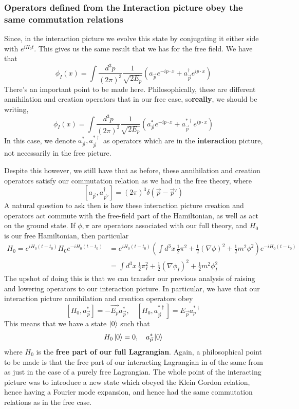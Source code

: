 \documentclass[11pt, oneside]{article}   	%
\theoremstyle{newline}
\theoremstyle{newline}
\theoremstyle{newline}
\theoremstyle{newline}
\theoremstyle{newline}
\begin{document}
\subsubsection{Operators defined from the Interaction picture obey the same commutation relations} 
Since, in the interaction picture we evolve this 
state by conjugating it either side with $ e^{ i  H_0 t }$. 
This gives us the same result that we 
has for the free field. We have that 
\[
\phi_ I ( x) = \int \frac{ d^ 3 p }{ ( 2 \pi ) ^3 } \frac{ 1 }{ \sqrt{ 2 E_p }  } (a_{ \vec{p}}  e^{  - i p \cdot  x } + a_{ \vec{p} }^\dagger e^{ i p \cdot  x } )  
\] There's an important point to be made here. 
Philosophically, these are different annihilation and 
creation operators that in our free case, so\textbf{really}, 
we should be writing, 
\[
\phi_ I ( x) = \int \frac{ d^ 3 p }{ ( 2 \pi ) ^3 } \frac{ 1 }{ \sqrt{ 2 E_p }  } (a_{ \vec{p}}^*  e^{  - i p \cdot  x } + a_{ \vec{p} }^{* \dagger}  e^{ i p \cdot  x } )  
\]
In this case, we denote $ a_{ \vec{p}}^ * , a_{\vec{p}}^ { * \dagger }  $ as 
operators which are in the \textbf{interaction} picture, 
not necessarily in the free picture. 

Despite this however, we still have that 
as before, these annihilation and 
creation operators satisfy our commutation relation as we had in 
the free theory, where 
\[
[ a_{ \vec{p} } , a_{ \vec{p}' } ^ \dagger ] = ( 2 \pi ) ^ 3 \delta ( \vec{p}- \vec{p}' ) 
\] 
A natural question to ask then is how these interaction picture
creation and operators act commute with the free-field part of the Hamiltonian, 
as well as act on the ground state. If $\phi , \pi $ are operators
associated with our full theory, and $ H_0 $ is our free Hamiltonian, 
then particular 
\begin{align*}
H_0 = e^{ i H_0 ( t - t_0) } H_0 e ^{  - iH_0 ( t - t_0) } &=   e^{ i H_0 ( t - t_0) } \left( \int d^ 3 x \, \frac{1}{2} \pi ^ 2 + \frac{1}{2 } ( \nabla  \phi ) ^ 2 + \frac{1}{2 } m ^ 2 \phi ^ 2  \right)   e ^{  - iH_0 ( t - t_0) } \\
				    &=  \int d^ 3 x \,  \frac{1}{2 } \pi_I ^ 2 +  \frac{1}{2 }( \nabla \phi_I ) ^ 2  + \frac{1}{2 } m^ 2 \phi_I ^ 2  
\end{align*}
The upshot of doing this is that we can transfer our previous analysis of raising and
lowering operators to our interaction picture. In particular, 
we have that our interaction picture annihilation and creation operators obey 
\[
[ H_0 , a_{ \vec{p} } ^ * ] = - \vec{E_p} a_{ \vec{p} }^ * , \quad [ H_0 , a_{ \vec{p} }^{ * \dagger } ] = E_{\vec{p} } a_{p } ^{ * \dagger}
\] This means that we have a state $ \ket{ 0 }  $ such that 
\[
H_0 \ket{ 0 } = 0, \quad a_{ \vec{p} }^ * \ket{ 0 } 
\] where $ H_0 $ is the \textbf{free part of our full Lagrangian}. 
Again, a philosophical point to be made is that the free part of our 
interacting Lagrangian in of the same from as just in the case of a purely free Lagrangian. 
The whole point of the interacting picture was to introduce a new state
which obeyed the Klein Gordon relation, hence having a Fourier mode expansion, 
and hence had the same commutation relations as in the free case. 
\end{document}
